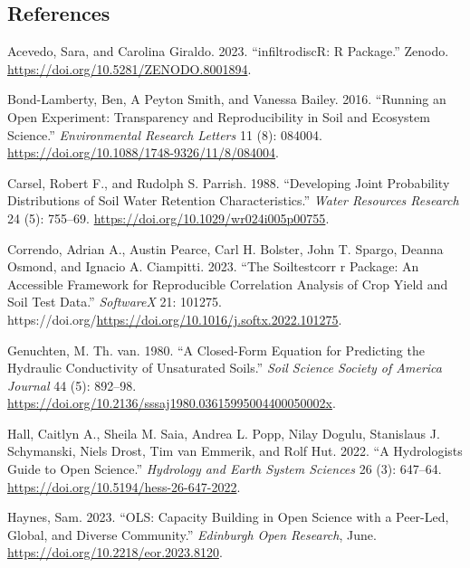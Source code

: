 \documentclass[
]{article}
\newlength{\cslhangindent}
\newlength{\cslentryspacingunit} %
\newenvironment{CSLReferences}[2] %
 {%
  \setlength{\parindent}{0pt}
  \ifodd #1
  \let\oldpar\par
  \def\par{\hangindent=\cslhangindent\oldpar}
  \fi
  \setlength{\parskip}{#2\cslentryspacingunit}
 }%
 {}
\begin{document}
\hypertarget{references}{%
\subsection*{References}\label{references}}

\hypertarget{refs}{}
\begin{CSLReferences}{1}{0}
\leavevmode{}%
Acevedo, Sara, and Carolina Giraldo. 2023. {``infiltrodiscR: R
Package.''} Zenodo. \url{https://doi.org/10.5281/ZENODO.8001894}.

\leavevmode{}%
Bond-Lamberty, Ben, A Peyton Smith, and Vanessa Bailey. 2016. {``Running
an Open Experiment: Transparency and Reproducibility in Soil and
Ecosystem Science.''} \emph{Environmental Research Letters} 11 (8):
084004. \url{https://doi.org/10.1088/1748-9326/11/8/084004}.

\leavevmode{}%
Carsel, Robert F., and Rudolph S. Parrish. 1988. {``Developing Joint
Probability Distributions of Soil Water Retention Characteristics.''}
\emph{Water Resources Research} 24 (5): 755--69.
\url{https://doi.org/10.1029/wr024i005p00755}.

\leavevmode{}%
Correndo, Adrian A., Austin Pearce, Carl H. Bolster, John T. Spargo,
Deanna Osmond, and Ignacio A. Ciampitti. 2023. {``The Soiltestcorr r
Package: An Accessible Framework for Reproducible Correlation Analysis
of Crop Yield and Soil Test Data.''} \emph{SoftwareX} 21: 101275.
https://doi.org/\url{https://doi.org/10.1016/j.softx.2022.101275}.

\leavevmode{}%
Genuchten, M. Th. van. 1980. {``A Closed-Form Equation for Predicting
the Hydraulic Conductivity of Unsaturated Soils.''} \emph{Soil Science
Society of America Journal} 44 (5): 892--98.
\url{https://doi.org/10.2136/sssaj1980.03615995004400050002x}.

\leavevmode{}%
Hall, Caitlyn A., Sheila M. Saia, Andrea L. Popp, Nilay Dogulu,
Stanislaus J. Schymanski, Niels Drost, Tim van Emmerik, and Rolf Hut.
2022. {``A Hydrologist{\textquotesingle}s Guide to Open Science.''}
\emph{Hydrology and Earth System Sciences} 26 (3): 647--64.
\url{https://doi.org/10.5194/hess-26-647-2022}.

\leavevmode{}%
Haynes, Sam. 2023. {``{OLS}: Capacity Building in Open Science with a
Peer-Led, Global, and Diverse Community.''} \emph{Edinburgh Open
Research}, June. \url{https://doi.org/10.2218/eor.2023.8120}.


\end{CSLReferences}
\end{document}
